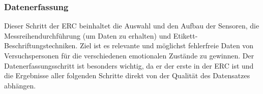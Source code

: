 \subsubsection{Datenerfassung} \label{datenerfassung-0}

Dieser Schritt der ERC beinhaltet die Auswahl und den Aufbau der Sensoren, die Messreihendurchf{\"u}hrung (um Daten zu erhalten) und Etikett-Beschriftungstechniken.
Ziel ist es relevante und m{\"o}glichst fehlerfreie Daten von Versuchspersonen f{\"u}r die verschiedenen emotionalen Zust{\"a}nde zu gewinnen.
Der Datenerfassungsschritt ist besonders wichtig, da er der erste in der ERC ist und die Ergebnisse aller folgenden Schritte direkt von der Qualit{\"a}t des Datensatzes abh{\"a}ngen. \\